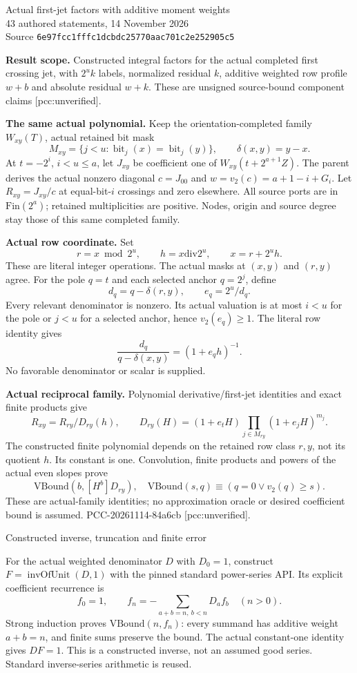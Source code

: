 \documentclass[10pt]{article}
\begin{document}
\begin{center}
{\Large Actual first-jet factors with additive moment weights}\\[4pt]
43 authored statements, 14 November 2026\\
Source \texttt{6e97fcc1fffc1dcbdc25770aac701c2e252905c5}
\end{center}
\textbf{Result scope.} Constructed integral factors for the actual completed
first crossing jet, with $2^u k$ labels, normalized residual $k$, additive
weighted row profile $w+b$ and absolute residual $w+k$. These are unsigned
source-bound component claims [pcc:unverified].

\textbf{The same actual polynomial.} Keep the orientation-completed family
$W_{xy}(T)$, actual retained bit mask
\[
 M_{xy}=\{j<u:\operatorname{bit}_j(x)=\operatorname{bit}_j(y)\},
 \qquad \delta(x,y)=y-x.
\]
At $t=-2^i$, $i<u\le a$, let $J_{xy}$ be coefficient one of
$W_{xy}(t+2^{a+1}Z)$. The parent derives the actual nonzero diagonal
$c=J_{00}$ and $w=v_2(c)=a+1-i+G_i$. Let $R_{xy}=J_{xy}/c$ at equal-bit-$i$
crossings and zero elsewhere. All source ports are in $\mathrm{Fin}(2^a)$;
retained multiplicities are positive. Nodes, origin and source degree stay
those of this same completed family.

\textbf{Actual row coordinate.} Set
\[
 r=x\bmod2^u,\qquad h=x\mathbin{\mathrm{div}}2^u,
 \qquad x=r+2^u h.
\]
These are literal integer operations. The actual masks at $(x,y)$ and
$(r,y)$ agree. For the pole $q=t$ and each selected anchor $q=2^j$, define
\[
 d_q=q-\delta(r,y),\qquad e_q=2^u/d_q.
\]
Every relevant denominator is nonzero. Its actual valuation is at most
$i<u$ for the pole or $j<u$ for a selected anchor, hence $v_2(e_q)\ge1$.
The literal row identity gives
\[
 \frac{d_q}{q-\delta(x,y)}=(1+e_q h)^{-1}.
\]
No favorable denominator or scalar is supplied.

\textbf{Actual reciprocal family.} Polynomial derivative/first-jet
identities and exact finite products give
\[
 R_{xy}=R_{ry}/D_{ry}(h),\qquad
 D_{ry}(H)=(1+e_t H)\prod_{j\in M_{ry}}(1+e_j H)^{m_j}.
\]
The constructed finite polynomial depends on the retained row class $r,y$,
not its quotient $h$. Its constant is one. Convolution, finite products and
powers of the actual even slopes prove
\[
 \mathrm{VBound}(b,[H^b]D_{ry}),
 \quad \mathrm{VBound}(s,q)\equiv(q=0\lor v_2(q)\ge s).
\]
These are actual-family identities; no approximation oracle or desired
coefficient bound is assumed. PCC-20261114-84a6cb [pcc:unverified].

\newpage
\begin{center}{\Large Constructed inverse, truncation and finite error}\end{center}
For the actual weighted denominator $D$ with $D_0=1$, construct
$F=\operatorname{invOfUnit}(D,1)$ with the pinned standard power-series API.
Its explicit coefficient recurrence is
\[
 f_0=1,\qquad f_n=-\sum_{a+b=n,\ b<n}D_a f_b\quad(n>0).
\]
Strong induction proves $\mathrm{VBound}(n,f_n)$: every summand has additive
weight $a+b=n$, and finite sums preserve the bound. The actual constant-one
identity gives $DF=1$. This is a constructed inverse, not an assumed good
series. Standard inverse-series arithmetic is reused.
\end{document}
